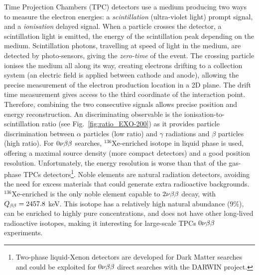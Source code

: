 Time Projection Chambers (TPC) detectors use a medium producing two ways to measure the electron energies: a \emph{scintillation} (ultra-violet light) prompt signal, and a \emph{ionisation} delayed signal.
When a particle crosses the detector, a scintillation light is emitted, the energy of the scintillation peak depending on the medium.
Scintillation photons, travelling at speed of light in the medium, are detected by photo-sensors, giving the \emph{zero-time} of the event.
The crossing particle ionises the medium all along its way, creating electrons drifting to a collection system (an electric field is applied between cathode and anode), allowing the precise measurement of the electron production location in a 2D plane.
The drift time measurement gives access to the third coordinate of the interaction point.
Therefore, combining the two consecutive signals allows precise position and energy reconstruction.
An discriminating observable is the ionisation-to-scintillation ratio (see Fig.~\ref{fig:ratio_EXO-200}) as it provides particle discrimination between $\alpha$ particles (low ratio) and $\gamma$ radiations and $\beta$ particles (high ratio).
For $0\nu\beta\beta$ searches, $^{136}$Xe-enriched isotope in liquid phase is used, offering a maximal source density (more compact detectors) and a good position resolution.
Unfortunately, the energy resolution is worse than that of the gas-phase TPCs detectors\footnote{Two-phase liquid-Xenon detectors are developed for Dark Matter searches and could be exploited for $0\nu\beta\beta$ direct searches with the DARWIN project.}.
Noble elements are natural radiation detectors, avoiding the need for excess materials that could generate extra radioactive backgrounds.
$^{136}$Xe-enriched is the only noble element capable to $2\nu\beta\beta$ decay, with $Q_{\beta\beta}=2457.8$ keV.
This isotope has a relatively high natural abundance ($9$\%), can be enriched to highly pure concentrations, and does not have other long-lived radioactive isotopes, making it interesting for large-scale TPCs $0\nu\beta\beta$ experiments.

